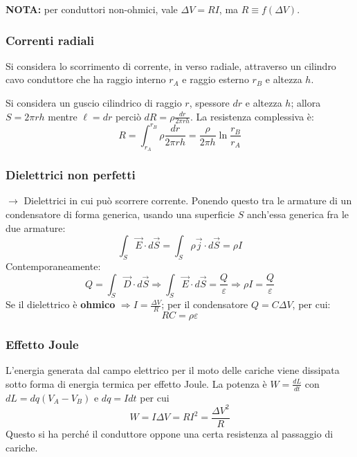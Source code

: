 \documentclass[a4paper]{scrartcl}
\numberwithin{equation}{subsection}
\theoremstyle{style1}
\begin{document}
\noindent \textbf{NOTA:} per conduttori non-ohmici, vale $\Delta V=RI$, ma $R\equiv f(\Delta V)$. 
\subsubsection{Correnti radiali}

Si considera lo scorrimento di corrente, in verso radiale, attraverso un cilindro cavo conduttore che ha raggio interno $r_A$ e raggio esterno $r_B$ e altezza $h$.

Si considera un guscio cilindrico di raggio $r$, spessore $dr$ e altezza $h$; allora $S = 2 \pi r h$ mentre $\ell = dr$ perci\`o $dR = \rho  \frac{dr}{2\pi r h}$. La resistenza complessiva \`e:
\begin{equation}
	R = \int_{r_A} ^{r_B} \rho  \frac{dr}{2\pi r h} = \frac{\rho }{2 \pi h}\ln \frac{r_B}{r_A} 
\end{equation}

\subsubsection{Dielettrici non perfetti}

$\to$ Dielettrici in cui pu\`o scorrere corrente. Ponendo questo tra le armature di un condensatore di forma generica, usando una superficie $S$ anch'essa generica fra le due armature:
\begin{equation}
	\int_{S} \vec{E}\cdot d\vec{S} = \int_{S} \rho  \vec{j}\cdot d\vec{S} = \rho I
\end{equation}
Contemporaneamente:
\begin{equation}
	Q = \int_{S} \vec{D}\cdot d\vec{S}\Rightarrow \int_{S} \vec{E}\cdot d\vec{S} = \frac{Q}{\varepsilon } \Rightarrow \rho I = \frac{Q}{\varepsilon }
\end{equation}
Se il dielettrico \`e \textbf{ohmico} $\Rightarrow I = \frac{\Delta V}{R}$; per il condensatore $Q = C\Delta V$, per cui:
\begin{equation}
	RC = \rho \varepsilon 
\end{equation}
\subsubsection{Effetto Joule}
L'energia generata dal campo elettrico per il moto delle cariche viene dissipata sotto forma di energia termica per effetto Joule. La potenza \`e $W = \frac{dL}{dt}$ con $dL = dq (V_A-V_B)$ e $dq = I dt$ per cui
\begin{equation}
	W = I \Delta V = RI^2 = \frac{\Delta V^2}{R}
\end{equation}
Questo si ha perch\'e il conduttore oppone una certa resistenza al passaggio di cariche.
\end{document}
